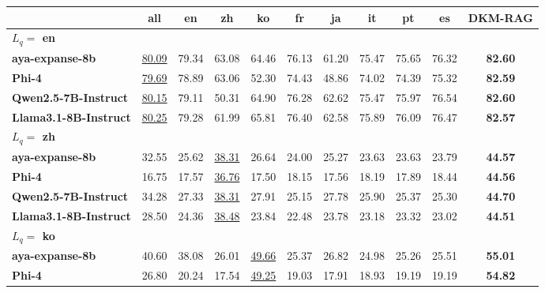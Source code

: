\begin{table*}[t]
\centering
\footnotesize	
\renewcommand{\arraystretch}{1.1}
\setlength{\tabcolsep}{5pt}
\begin{tabular}{lcccccccccc}
\toprule
 & \textbf{all} & \textbf{en} & \textbf{zh} & \textbf{ko} & \textbf{fr} & \textbf{ja} & \textbf{it} & \textbf{pt} & \textbf{es} & \textbf{DKM-RAG} \\
\midrule
\multicolumn{11}{l}{\textbf{$L_q =$ en}} \\
\midrule
\textbf{aya-expanse-8b}       & \underline{80.09} & \cellcolor{yellow}79.34 & 63.08 & 64.46 & 76.13 & 61.20 & 75.47 & 75.65 & 76.32 & \textbf{82.60} \\
\textbf{Phi-4}                & \underline{79.69} & \cellcolor{yellow}78.89 & 63.06 & 52.30 & 74.43 & 48.86 & 74.02 & 74.39 & 75.32 & \textbf{82.59} \\
\textbf{Qwen2.5-7B-Instruct}  & \underline{80.15} & \cellcolor{yellow}79.11 & 50.31 & 64.90 & 76.28 & 62.62 & 75.47 & 75.97 & 76.54 & \textbf{82.60} \\
\textbf{Llama3.1-8B-Instruct} & \underline{80.25} & \cellcolor{yellow}79.28 & 61.99 & 65.81 & 76.40 & 62.58 & 75.89 & 76.09 & 76.47 & \textbf{82.57} \\
\midrule
\multicolumn{11}{l}{\textbf{$L_q =$ zh}} \\
\midrule
\textbf{aya-expanse-8b}       & 32.55 & 25.62 & \cellcolor{yellow}\underline{38.31} & 26.64 & 24.00 & 25.27 & 23.63 & 23.63 & 23.79 & \textbf{44.57} \\
\textbf{Phi-4}                & 16.75 & 17.57 & \cellcolor{yellow}\underline{36.76} & 17.50 & 18.15 & 17.56 & 18.19 & 17.89 & 18.44 & \textbf{44.56} \\
\textbf{Qwen2.5-7B-Instruct}  & 34.28 & 27.33 & \cellcolor{yellow}\underline{38.31} & 27.91 & 25.15 & 27.78 & 25.90 & 25.37 & 25.30 & \textbf{44.70} \\
\textbf{Llama3.1-8B-Instruct} & 28.50 & 24.36 & \cellcolor{yellow}\underline{38.48} & 23.84 & 22.48 & 23.78 & 23.18 & 23.32 & 23.02 & \textbf{44.51} \\
\midrule
\multicolumn{11}{l}{\textbf{$L_q =$ ko}} \\
\midrule
\textbf{aya-expanse-8b}       & 40.60 & 38.08 & 26.01 & \cellcolor{yellow}\underline{49.66} & 25.37 & 26.82 & 24.98 & 25.26 & 25.51 & \textbf{55.01} \\
\textbf{Phi-4}                & 26.80 & 20.24 & 17.54 & \cellcolor{yellow}\underline{49.25} & 19.03 & 17.91 & 18.93 & 19.19 & 19.19 & \textbf{54.82} \\

\end{tabular}
\end{table*}
